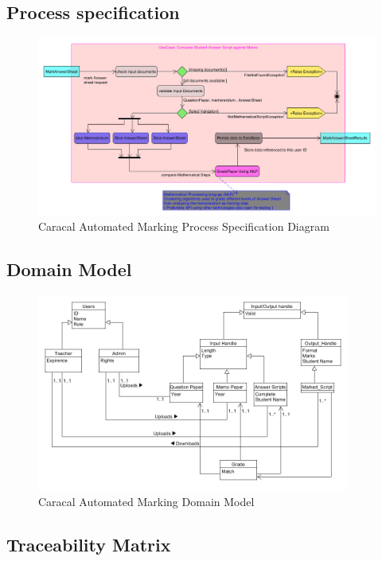 \documentclass{article}
\begin{document}
	\subsection{Process specification}
	\begin{figure}[h]
	\includegraphics[width=\linewidth]{processSpecification.png}
	\caption{Caracal Automated Marking Process Specification Diagram}
	\end{figure}
	\subsection{Domain Model}
	\begin{figure}[h]
		\includegraphics[width=\linewidth,height=245px]{Domain_Model.png}
		\caption{Caracal Automated Marking Domain Model}
	\end{figure}
    \subsection{Traceability Matrix}
\end{document}
